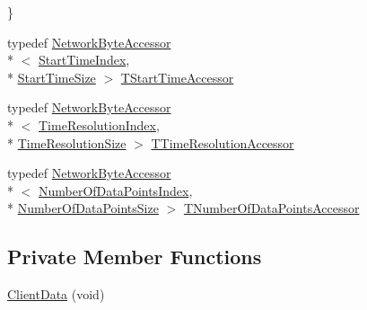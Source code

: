 \begin{DoxyCompactItemize}
 \}
\item 
typedef \hyperlink{class_terra_swarm_1_1_network_byte_accessor}{Network\-Byte\-Accessor}\\*
$<$ \hyperlink{class_terra_swarm_1_1_asynchronous_1_1_client_data_aa673343abbf055d48820fa210064a1dba01941423451995fbb2656b85f2199b06}{Start\-Time\-Index}, \\*
\hyperlink{class_terra_swarm_1_1_asynchronous_1_1_client_data_ac66a46fcb609d1205cef15f85cd551b0a669ddc8638e4c5d6c0ae519ff59f66c1}{Start\-Time\-Size} $>$ \hyperlink{class_terra_swarm_1_1_asynchronous_1_1_client_data_a9d8f2e887da6bef7fc623b4ca8e2cf57}{T\-Start\-Time\-Accessor}
\item 
typedef \hyperlink{class_terra_swarm_1_1_network_byte_accessor}{Network\-Byte\-Accessor}\\*
$<$ \hyperlink{class_terra_swarm_1_1_asynchronous_1_1_client_data_aa673343abbf055d48820fa210064a1dba5f51978c66fb63b9b2e7e7fabc6f8b32}{Time\-Resolution\-Index}, \\*
\hyperlink{class_terra_swarm_1_1_asynchronous_1_1_client_data_ac66a46fcb609d1205cef15f85cd551b0ac13dfbedd3bb3241adca682ae0cae309}{Time\-Resolution\-Size} $>$ \hyperlink{class_terra_swarm_1_1_asynchronous_1_1_client_data_acda5940545173f5f000e8eb0fdb8c712}{T\-Time\-Resolution\-Accessor}
\item 
typedef \hyperlink{class_terra_swarm_1_1_network_byte_accessor}{Network\-Byte\-Accessor}\\*
$<$ \hyperlink{class_terra_swarm_1_1_asynchronous_1_1_client_data_aa673343abbf055d48820fa210064a1dba55c2f5bf31d40f83c6fec0e3943e4985}{Number\-Of\-Data\-Points\-Index}, \\*
\hyperlink{class_terra_swarm_1_1_asynchronous_1_1_client_data_ac66a46fcb609d1205cef15f85cd551b0a5042b9a88db56411ee2879d930f5defb}{Number\-Of\-Data\-Points\-Size} $>$ \hyperlink{class_terra_swarm_1_1_asynchronous_1_1_client_data_a5a4bdd7c49a72f585ba8c0216a241bb8}{T\-Number\-Of\-Data\-Points\-Accessor}
\end{DoxyCompactItemize}
\subsection*{Private Member Functions}
\begin{DoxyCompactItemize}
\item 
\hyperlink{class_terra_swarm_1_1_asynchronous_1_1_client_data_ad17e5aeaa79fe4815bfe6187b32632f4}{Client\-Data} (void)
\end{DoxyCompactItemize}


